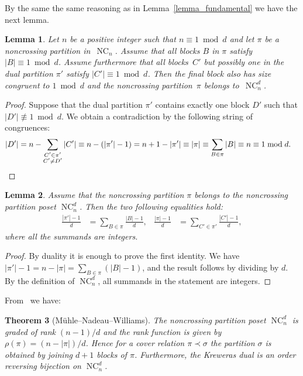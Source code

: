 \documentclass[11pt]{amsart}
\newtheorem{theorem}{Theorem}[section]
\newtheorem{lemma}[theorem]{Lemma}
\numberwithin{equation}{section}
\newcommand{\coveredby}{\prec}
\DeclareMathOperator{\NC}{NC}
\begin{document}
By the same the same reasoning as in Lemma~\ref{lemma_fundamental}
we have the next lemma.
\begin{lemma}
Let $n$ be a positive integer such that $n \equiv 1 \bmod d$ and
let $\pi$ be a noncrossing partition in~$\NC_{n}$.
Assume that all blocks $B$ in $\pi$ satisfy $|B| \equiv 1 \bmod d$.
Assume furthermore
that all blocks~$C'$ but possibly one in the dual partition $\pi'$ satisfy $|C'| \equiv 1 \bmod d$.
Then the final block also has size
congruent to $1 \bmod d$ and
the noncrossing partition~$\pi$ belongs to~$\NC^{d}_{n}$.
\label{lemma_all_but_one}
\end{lemma}
\begin{proof}
Suppose that the dual partition $\pi'$ contains exactly
one block $D'$ such that
$|D'| \not\equiv 1 \bmod d$.
We obtain a contradiction 
by the following string of congruences:
\begin{align*}
|D'|
& =
n - \sum_{\substack{C' \in \pi' \\ C' \neq D'}} |C'|
\equiv
n - (|\pi'| - 1)
=
n + 1 - |\pi'|
\equiv
|\pi|
\equiv
\sum_{B \in \pi} |B|
\equiv 
n
\equiv
1 \bmod d.
\qedhere
\end{align*}
\end{proof}

\begin{lemma}
Assume that the noncrossing partition $\pi$ belongs to the noncrossing partition poset $\NC^{d}_{n}$.
Then the two following equalities hold:
\begin{align*}
\frac{|\pi'| - 1}{d} 
& =
\sum_{B \in \pi} \frac{|B| - 1}{d} ,
&
\frac{|\pi| - 1}{d} 
& =
\sum_{C' \in \pi'} \frac{|C'| - 1}{d} ,
\end{align*}
where all the summands are integers.
\label{lemma_blocks_versus_dual_partition}
\end{lemma}
\begin{proof}
By duality it is enough to prove the first identity.
We have $|\pi'| - 1 = n - |\pi| = \sum_{B \in \pi} (|B| - 1)$,
and the result follows by dividing by $d$.
By the definition of $\NC^{d}_{n}$, all summands in the statement are integers.
\end{proof}



From~\cite{Muhle_Nadeau_Williams} we have:
\begin{theorem}[M\"uhle--Nadeau--Williams]
The noncrossing partition poset $\NC^{d}_{n}$ is graded of rank $(n-1)/d$
and the rank function is given by $\rho(\pi) = (n-|\pi|)/d$.
Hence for a cover relation $\pi \coveredby \sigma$
the partition $\sigma$ is obtained by joining $d+1$ blocks of $\pi$.
Furthermore, the Kreweras dual
is an order reversing bijection on $\NC^{d}_{n}$.
\label{theorem_NC_structure}
\end{theorem}
\end{document}
